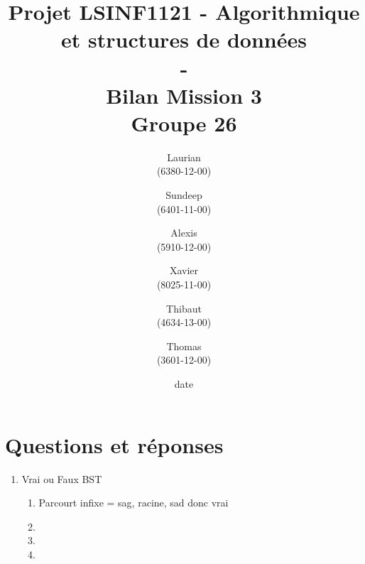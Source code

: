 \documentclass[11pt]{article}
\title{\textbf{Projet LSINF1121 -  Algorithmique et structures de données\\ - \\ Bilan Mission 3} \\ {\large Groupe 26}}
\author{Laurian \bsc{Detiffe} \\(6380-12-00)\and Sundeep \bsc{Dhillon} \\(6401-11-00)\and Alexis \bsc{Macq} \\ (5910-12-00) \and Xavier \bsc{Pérignon} \\ (8025-11-00)\and Thibaut \bsc{Piquard}\\(4634-13-00)\and Thomas \bsc{Wyckmans} \\ (3601-12-00)}
\date{date}
\date{\vspace*{25mm}
\texttt{[image: logo.jpg]}\\
		\vspace*{30mm}
		\begin{center}
		Année académique 2015-2016 \\	
		\end{center}}
\begin{document}
\thispagestyle{empty}

\maketitle
\thispagestyle{empty}

\section*{Questions et réponses}
\begin{enumerate}
\item Vrai ou Faux BST
\begin{enumerate}
\item Parcourt infixe = sag, racine, sad donc vrai
\item
\item
\item
\end{enumerate}

\end{enumerate}
\end{document}
